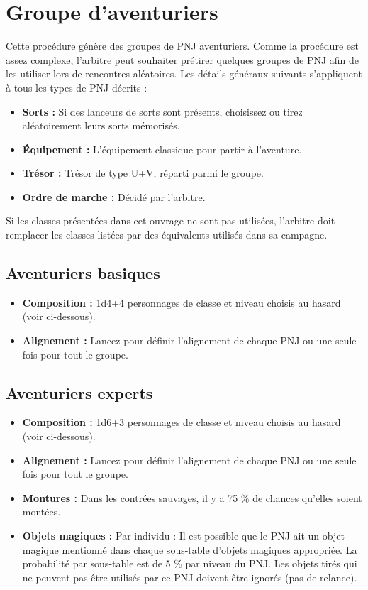 \chapter{Groupe d'aventuriers}\label{groupe-daventuriers}
Cette procédure génère des groupes de PNJ aventuriers. Comme la
procédure est assez complexe, l'arbitre peut souhaiter prétirer quelques
groupes de PNJ afin de les utiliser lors de rencontres aléatoires. Les
détails généraux suivants s'appliquent à tous les types de PNJ décrits :

\begin{itemize}
\tightlist
\item
  \textbf{Sorts :} Si des lanceurs de sorts sont présents, choisissez ou
  tirez aléatoirement leurs sorts mémorisés.
\item
  \textbf{Équipement :} L'équipement classique pour partir à l'aventure.
\item
  \textbf{Trésor :} Trésor de type U+V, réparti parmi le groupe.
\item
  \textbf{Ordre de marche :} Décidé par l'arbitre.
\end{itemize}

Si les classes présentées dans cet ouvrage ne sont pas utilisées,
l'arbitre doit remplacer les classes listées par des équivalents
utilisés dans sa campagne.

\section*{Aventuriers basiques}\label{aventuriers-basiques}

\begin{itemize}
\tightlist
\item
  \textbf{Composition :} 1d4+4 personnages de classe et niveau choisis
  au hasard (voir ci-dessous).
\item
  \textbf{Alignement :} Lancez pour définir l'alignement de chaque PNJ
  ou une seule fois pour tout le groupe.
\end{itemize}

\section*{Aventuriers experts}\label{aventuriers-experts}

\begin{itemize}
\tightlist
\item
  \textbf{Composition :} 1d6+3 personnages de classe et niveau choisis
  au hasard (voir ci-dessous).
\item
  \textbf{Alignement :} Lancez pour définir l'alignement de chaque PNJ
  ou une seule fois pour tout le groupe.
\item
  \textbf{Montures :} Dans les contrées sauvages, il y a 75 \% de
  chances qu'elles soient montées.
\item
  \textbf{Objets magiques :} Par individu : Il est possible que le PNJ
  ait un objet magique mentionné dans chaque sous-table d'objets
  magiques appropriée.
  La probabilité par sous-table est de 5 \% par niveau du PNJ. Les
  objets tirés qui ne peuvent pas être utilisés par ce PNJ doivent être
  ignorés (pas de relance).
\end{itemize}

